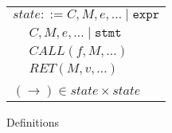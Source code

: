 \documentclass{article}
\begin{document}
\begin{figure}
\begin{minipage}[t]{0.49\textwidth}
\begin{tabular}{l | l}
      \multicolumn{2}{r}{\(\mathit{state} ::= C, M, e, \ldots \mid \mathtt{expr}\)} \\
      \hspace{4em} & \(C, M, e, \ldots \mid \mathtt{stmt}\) \\
      \hspace{4em} & \(\mathit{CALL}(f, M, \ldots)\)  \\
      \hspace{4em} & \(\mathit{RET}(M, v, \ldots)\) \\
      \multicolumn{2}{l}{} \\
      \multicolumn{2}{l}{\hspace{1.5em}\((\longrightarrow) \in \mathit{state} \times \mathit{state}\)} \\
    \end{tabular}
  \end{minipage}


  \caption{Definitions}
  \label{subfig:defs}
  \label{fig:memmod}
\end{figure}
\end{document}
